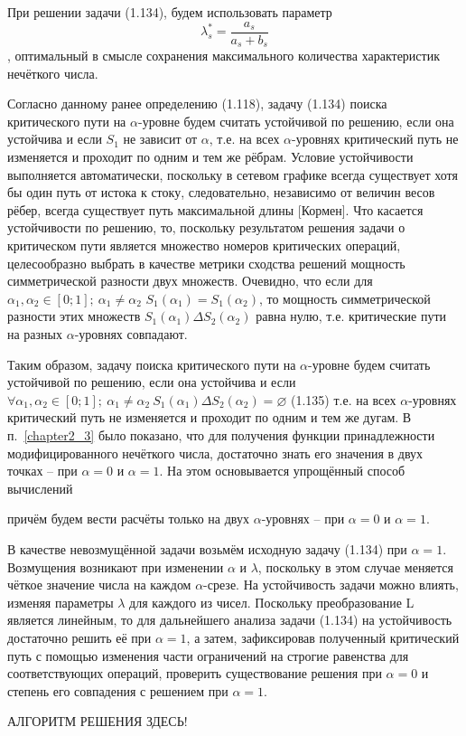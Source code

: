 При решении задачи (1.134), будем использовать параметр \[\lambda _{s}^{*}=\frac{{{a}_{s}}}{{{a}_{s}}+{{b}_{s}}}\], оптимальный в смысле сохранения максимального количества характеристик нечёткого числа.

Согласно данному ранее определению (1.118), задачу (1.134) поиска критического пути на $\alpha$-уровне будем считать устойчивой по решению, если она устойчива и если $S_1$ не зависит от $\alpha$, т.е. на всех $\alpha$-уровнях критический путь не изменяется и проходит по одним и тем же рёбрам. Условие устойчивости выполняется автоматически, поскольку в сетевом графике всегда существует хотя бы один путь от истока к стоку, следовательно, независимо от величин весов рёбер, всегда существует путь максимальной длины [Кормен]. Что касается устойчивости по решению, то, поскольку результатом решения задачи о критическом пути является множество номеров критических операций, целесообразно выбрать в качестве метрики сходства решений мощность симметрической разности двух множеств. Очевидно, что если для ${{\alpha }_{1}},{{\alpha }_{2}}\in \left[ 0;1 \right];\ {{\alpha }_{1}}\ne {{\alpha }_{2}}$ ${{S}_{1}}\left( {{\alpha }_{1}} \right)={{S}_{1}}\left( {{\alpha }_{2}} \right)$, то мощность симметрической разности этих множеств ${{S}_{1}}\left( {{\alpha }_{1}} \right)\Delta {{S}_{2}}\left( {{\alpha }_{2}} \right)$ равна нулю, т.е. критические пути на разных $\alpha$-уровнях совпадают.

Таким образом, задачу поиска критического пути на $\alpha $-уровне будем считать устойчивой по решению, если она устойчива и если 
	$\forall {{\alpha }_{1}},{{\alpha }_{2}}\in \left[ 0;1 \right];\ {{\alpha }_{1}}\ne {{\alpha }_{2}}\ {{S}_{1}}\left( {{\alpha }_{1}} \right)\Delta {{S}_{2}}\left( {{\alpha }_{2}} \right)=\varnothing $ 	(1.135)
т.е. на всех $\alpha $-уровнях критический путь не изменяется и проходит по одним и тем же дугам. 
В п.~\ref{chapter2_3} было показано, что для получения функции принадлежности модифицированного нечёткого числа, достаточно знать его значения в двух точках – при $\alpha=0$ и $\alpha=1$. На этом основывается упрощённый способ вычислений

причём будем вести расчёты только на двух $\alpha$-уровнях – при $\alpha=0$ и $\alpha=1$.

В качестве невозмущённой задачи возьмём исходную задачу (1.134) при $\alpha =1$. Возмущения возникают при изменении $\alpha$ и $\lambda$, поскольку в этом случае меняется чёткое значение числа на каждом $\alpha$-срезе. На устойчивость задачи можно влиять, изменяя параметры $\lambda$ для каждого из чисел. Поскольку преобразование L является линейным, то для дальнейшего анализа задачи (1.134) на устойчивость достаточно решить её при $\alpha =1$, а затем, зафиксировав полученный критический путь с помощью изменения части ограничений на строгие равенства для соответствующих операций, проверить существование решения при $\alpha =0$ и степень его совпадения с решением при $\alpha =1$.

АЛГОРИТМ РЕШЕНИЯ ЗДЕСЬ!